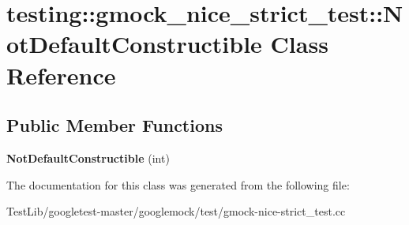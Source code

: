 \hypertarget{classtesting_1_1gmock__nice__strict__test_1_1NotDefaultConstructible}{}\section{testing\+:\+:gmock\+\_\+nice\+\_\+strict\+\_\+test\+:\+:Not\+Default\+Constructible Class Reference}
\label{classtesting_1_1gmock__nice__strict__test_1_1NotDefaultConstructible}
\subsection*{Public Member Functions}
\begin{DoxyCompactItemize}
\item 
\mbox{\label{classtesting_1_1gmock__nice__strict__test_1_1NotDefaultConstructible_acfaca2e03925805192b698708d6030bc}} 
{\bfseries Not\+Default\+Constructible} (int)
\end{DoxyCompactItemize}


The documentation for this class was generated from the following file\+:\begin{DoxyCompactItemize}
\item 
Test\+Lib/googletest-\/master/googlemock/test/gmock-\/nice-\/strict\+\_\+test.\+cc\end{DoxyCompactItemize}
